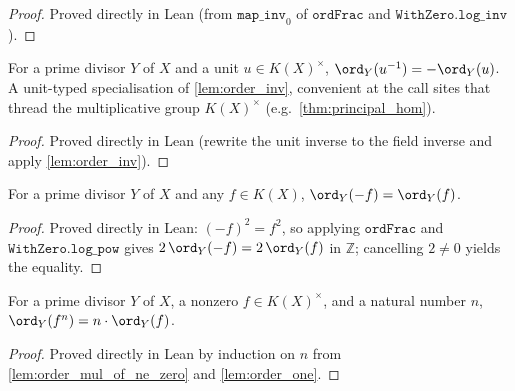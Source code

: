 \begin{proof}
  Proved directly in Lean (from \(\texttt{map\_inv}_0\) of \(\texttt{ordFrac}\)
  and \(\texttt{WithZero.log\_inv}\)).
\end{proof}
\begin{lemma}
  \label{lem:order_units_inv}
  For a prime divisor \(Y\) of \(X\) and a unit \(u \in K(X)^{\times}\),
  \(\ord_Y(u^{-1}) = -\ord_Y(u)\). A unit-typed specialisation of
  \ref{lem:order_inv}, convenient at the call sites that thread the
  multiplicative group \(K(X)^{\times}\) (e.g.\ \ref{thm:principal_hom}).
\end{lemma}
\begin{proof}
  Proved directly in Lean (rewrite the unit inverse to the field inverse and
  apply \ref{lem:order_inv}).
\end{proof}
\begin{lemma}
  \label{lem:order_neg}
  For a prime divisor \(Y\) of \(X\) and any \(f \in K(X)\),
  \(\ord_Y(-f) = \ord_Y(f)\).
\end{lemma}
\begin{proof}
  Proved directly in Lean: \((-f)^2 = f^2\), so applying \(\texttt{ordFrac}\)
  and \(\texttt{WithZero.log\_pow}\) gives \(2\,\ord_Y(-f) = 2\,\ord_Y(f)\) in
  \(\mathbb Z\); cancelling \(2 \neq 0\) yields the equality.
\end{proof}
\begin{lemma}
  \label{lem:order_pow_of_ne_zero}
  For a prime divisor \(Y\) of \(X\), a nonzero \(f \in K(X)^{\times}\), and a
  natural number \(n\), \(\ord_Y(f^n) = n \cdot \ord_Y(f)\).
\end{lemma}
\begin{proof}
  Proved directly in Lean by induction on \(n\) from
  \ref{lem:order_mul_of_ne_zero} and \ref{lem:order_one}.
\end{proof}
